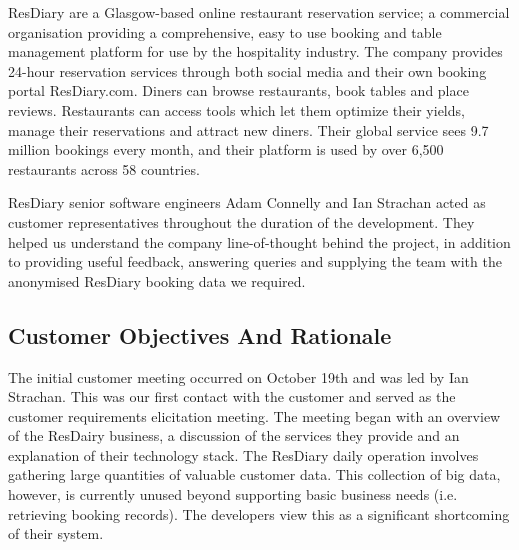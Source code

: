 \documentclass{l3proj}
\begin{document}

ResDiary are a Glasgow-based online restaurant reservation service; a commercial organisation providing a comprehensive, easy to use booking and table management platform for use by the hospitality industry. The company provides 24-hour reservation services through both social media and their own booking portal ResDiary.com. Diners can browse restaurants, book tables and place reviews. Restaurants can access tools which let them optimize their yields, manage their reservations and attract new diners. Their global service sees 9.7 million bookings every month, and their platform is used by over 6,500 restaurants across 58 countries. 

ResDiary senior software engineers Adam Connelly and Ian Strachan acted as customer representatives throughout the duration of the development. They helped us understand the company line-of-thought behind the project, in addition to providing useful feedback, answering queries and supplying the team with the anonymised ResDiary booking data we required.


\subsection{Customer Objectives And Rationale}
\label{sec:custobjectives}



The initial customer meeting occurred on October 19th and was led by Ian Strachan. This was our first contact with the customer and served as the customer requirements elicitation meeting. The meeting began with an overview of the ResDairy business, a discussion of the services they provide and an explanation of their technology stack. The ResDiary daily operation involves gathering large quantities of valuable customer data. This collection of big data, however, is currently unused beyond supporting basic business needs (i.e. retrieving booking records). The developers view this as a significant shortcoming of their system.
\end{document}
